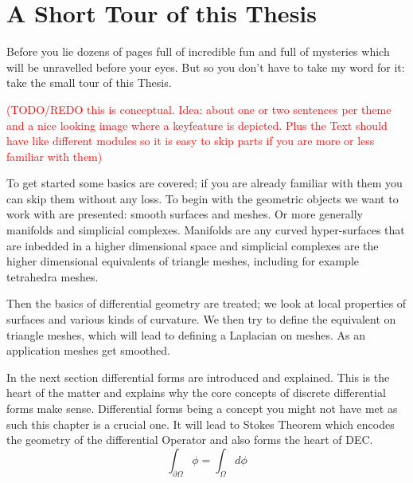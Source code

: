 


\section{A Short Tour of this Thesis}
Before you lie dozens of pages full of incredible fun and full of mysteries which will be unravelled before your eyes. But so you don't have to take my word for it: take the small tour of this Thesis. 

\textcolor{red}{(TODO/REDO this is conceptual. Idea: about one or two sentences per theme and a nice looking image where a keyfeature is depicted. Plus the Text should have like different modules so it is easy to skip parts if you are more or less familiar with them)}

To get started some basics are covered; if you are already familiar with them you can skip them without any loss.
To begin with the geometric objects we want to work with are presented: smooth surfaces and meshes. Or more generally manifolds and simplicial complexes. Manifolds are any curved hyper-surfaces that are inbedded in a higher dimensional space and simplicial complexes are the higher dimensional equivalents of triangle meshes, including for example tetrahedra meshes.

Then the basics of differential geometry are treated; we look at local properties of surfaces and various kinds of curvature. We then try to define the equivalent on triangle meshes, which will lead to defining a Laplacian on meshes. As an application meshes get smoothed.

In the next section  differential forms are introduced and explained. This is the heart of the matter and explains why the core concepts of discrete differential forms make sense. Differential forms being a concept you might not have met as such this chapter is a crucial one. It will lead to Stokes Theorem which encodes the geometry of the differential Operator and also forms the heart of DEC.
\[\int_{\partial\Omega} \phi = \int_{\Omega} d\phi\]

